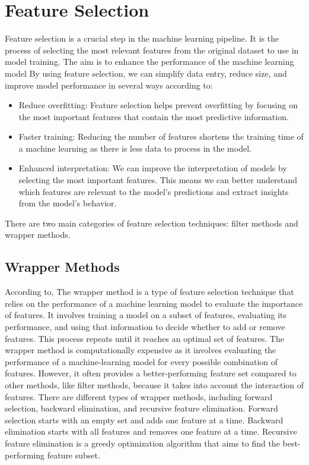 \documentclass[12pt]{report}
\begin{document}
\section*{Feature Selection}
Feature selection is a crucial step in the machine learning pipeline. It is the
process of selecting the most relevant features from the original dataset to
use in model training. The aim is to enhance the performance of the machine
learning model By using feature selection, we can simplify data entry, reduce
size, and improve model performance in several ways according
to\cite{guyon2003introduction}:

\begin{itemize}
      \item Reduce overfitting: Feature selection helps prevent overfitting by focusing on
            the most important features that contain the most predictive information.
      \item Faster training: Reducing the number of features shortens the training time of
            a machine learning as there is less data to process in the model.
      \item Enhanced interpretation: We can improve the interpretation of models by
            selecting the most important features. This means we can better understand
            which features are relevant to the model's predictions and extract insights
            from the model's behavior.

\end{itemize}

There are two main categories of feature selection techniques: filter methods
and wrapper methods.

\subsection*{Wrapper Methods}

According to\cite{kohavi1997}, The wrapper method is a type of feature
selection technique that relies on the performance of a machine learning model
to evaluate the importance of features. It involves training a model on a
subset of features, evaluating its performance, and using that information to
decide whether to add or remove features. This process repeats until it reaches
an optimal set of features. The wrapper method is computationally expensive as
it involves evaluating the performance of a machine-learning model for every
possible combination of features. However, it often provides a
better-performing feature set compared to other methods, like filter methods,
because it takes into account the interaction of features. There are different
types of wrapper methods, including forward selection, backward elimination,
and recursive feature elimination. Forward selection starts with an empty set
and adds one feature at a time. Backward elimination starts with all features
and removes one feature at a time. Recursive feature elimination is a greedy
optimization algorithm that aims to find the best-performing feature subset.\\
\end{document}
